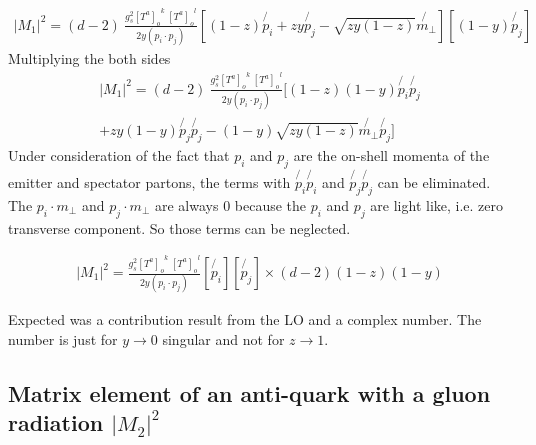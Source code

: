 \begin{equation}
\begin{split}
|M_1|^2=(d-2)\:\frac{g_s^2  {[T^a]_{o}}^k \: {[T^a]_o}^l }{2y(p_i \cdot p_j)}
[(1-z) \not{p_i}+zy \not{p_j} - \sqrt{zy(1-z)} \not{{m}_{\bot}}]
[(1-y) \not{p_j}]
\end{split}
\end{equation}
Multiplying the both sides 
\begin{equation}
\begin{split}
|M_1|^2=(d-2)\:\frac{g_s^2  {[T^a]_{o}}^k \: {[T^a]_o}^l }{2y(p_i \cdot p_j)}
[(1-z)(1-y) \not{p_i}\not{p_j} \\
+zy(1-y) \not{p_j}\not{p_j} - (1-y)\sqrt{zy(1-z)} \not{{m}_{\bot}}\not{p_j}]
\end{split}
\end{equation}
Under consideration of the fact that $ p_i $ and $ p_j $ are the on-shell momenta of the emitter and spectator partons, the terms with $ \not{p_i} \not{p_i} $ and $ \not{p_j} \not{p_j} $ can be eliminated.
The $ {p_i} \cdot  {m}_{\bot} $ and $ {p_j} \cdot  {m}_{\bot} $ are always $ 0 $ because the $ p_i $ and $ p_j $ are light like, i.e. zero transverse component. So those terms can be neglected.


\begin{equation}
\begin{split}
|M_1|^2=\frac{g_s^2  {[T^a]_{o}}^k \: {[T^a]_o}^l }{2y(p_i \cdot p_j)}
[\not{p_i}][\not{p_j}]\times(d-2)(1-z)(1-y)
\end{split}
\end{equation}

Expected was a contribution result from the LO and a complex number. The number is just for $ y \rightarrow 0 $ singular and not for $ z \rightarrow 1 $.

\newpage

\subsection{Matrix element of an anti-quark with a gluon radiation $ |M_2|^2 $}

